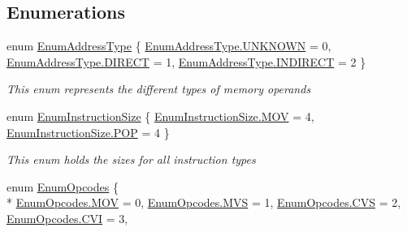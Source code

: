 \subsection*{Enumerations}
\begin{DoxyCompactItemize}
\item 
enum \hyperlink{namespace_c_p_u___o_s___simulator_1_1_c_p_u_ab76721f84dabbc14c907e6f11fbeb7c0}{Enum\+Address\+Type} \{ \hyperlink{namespace_c_p_u___o_s___simulator_1_1_c_p_u_ab76721f84dabbc14c907e6f11fbeb7c0a696b031073e74bf2cb98e5ef201d4aa3}{Enum\+Address\+Type.\+U\+N\+K\+N\+O\+W\+N} = 0, 
\hyperlink{namespace_c_p_u___o_s___simulator_1_1_c_p_u_ab76721f84dabbc14c907e6f11fbeb7c0a4c5d06b02c97731aaa976179c62dcf76}{Enum\+Address\+Type.\+D\+I\+R\+E\+C\+T} = 1, 
\hyperlink{namespace_c_p_u___o_s___simulator_1_1_c_p_u_ab76721f84dabbc14c907e6f11fbeb7c0a55e8f99cd4149c397fc50a5d1c86bd06}{Enum\+Address\+Type.\+I\+N\+D\+I\+R\+E\+C\+T} = 2
 \}\begin{DoxyCompactList}\small\item\em This enum represents the different types of memory operands \end{DoxyCompactList}
\item 
enum \hyperlink{namespace_c_p_u___o_s___simulator_1_1_c_p_u_af322082b9b46482202165fb547c052a7}{Enum\+Instruction\+Size} \{ \hyperlink{namespace_c_p_u___o_s___simulator_1_1_c_p_u_af322082b9b46482202165fb547c052a7a17b32100aef1fc19670be7fd58bc85df}{Enum\+Instruction\+Size.\+M\+O\+V} = 4, 
\hyperlink{namespace_c_p_u___o_s___simulator_1_1_c_p_u_af322082b9b46482202165fb547c052a7aefdb39a4c7286afcecf0e8a7435fce6a}{Enum\+Instruction\+Size.\+P\+O\+P} = 4
 \}\begin{DoxyCompactList}\small\item\em This enum holds the sizes for all instruction types \end{DoxyCompactList}
\item 
enum \hyperlink{namespace_c_p_u___o_s___simulator_1_1_c_p_u_ac29c87bff87ad404c953b2581024043e}{Enum\+Opcodes} \{ \\*
\hyperlink{namespace_c_p_u___o_s___simulator_1_1_c_p_u_ac29c87bff87ad404c953b2581024043ea17b32100aef1fc19670be7fd58bc85df}{Enum\+Opcodes.\+M\+O\+V} = 0, 
\hyperlink{namespace_c_p_u___o_s___simulator_1_1_c_p_u_ac29c87bff87ad404c953b2581024043ea69ad7d37a807081169292099cdec3d83}{Enum\+Opcodes.\+M\+V\+S} = 1, 
\hyperlink{namespace_c_p_u___o_s___simulator_1_1_c_p_u_ac29c87bff87ad404c953b2581024043ea51332b8fec73c1f1aeb5259d61fabb3a}{Enum\+Opcodes.\+C\+V\+S} = 2, 
\hyperlink{namespace_c_p_u___o_s___simulator_1_1_c_p_u_ac29c87bff87ad404c953b2581024043ead66368fbbeff252bb773b5b0837371b6}{Enum\+Opcodes.\+C\+V\+I} = 3, 

\end{DoxyCompactItemize}
